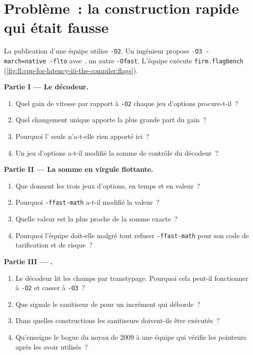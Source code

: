 \section{Problème~: la construction rapide qui était fausse}

\begin{problem}\label{pb:ll:cpp-for-latency-iii-the-compiler:1}
La publication d'une équipe utilise \texttt{-O2}. Un ingénieur propose
\texttt{-O3 -march=native -flto} avec , un autre \texttt{-Ofast}. L'équipe exécute \texttt{firm.flagbench}
(\cref{fig:ll:cpp-for-latency-iii-the-compiler:flags}).

\medskip\noindent\textbf{Partie I --- Le décodeur.}
\begin{enumerate}
\item Quel gain de vitesse par rapport à \texttt{-O2} chaque jeu d'options procure-t-il~?
\item Quel changement unique apporte la plus grande part du gain~?
\item Pourquoi l' seule n'a-t-elle rien apporté ici~?
\item Un jeu d'options a-t-il modifié la somme de contrôle du décodeur~?
\end{enumerate}

\medskip\noindent\textbf{Partie II --- La somme en virgule flottante.}
\begin{enumerate}[resume]
\item Que donnent les trois jeux d'options, en temps et en valeur~?
\item Pourquoi \texttt{-ffast-math} a-t-il modifié la valeur~?
\item Quelle valeur est la plus proche de la somme exacte~?
\item Pourquoi l'équipe doit-elle malgré tout refuser \texttt{-ffast-math} pour son code de tarification et de risque~?
\end{enumerate}

\medskip\noindent\textbf{Partie III --- .}
\begin{enumerate}[resume]
\item Le décodeur lit les champs par transtypage. Pourquoi cela peut-il fonctionner à \texttt{-O2} et casser à \texttt{-O3}~?
\item Que signale le sanitiseur de  pour un incrément qui déborde~?
\item Dans quelles constructions les sanitiseurs doivent-ils être exécutés~?
\item Qu'enseigne le bogue du noyau de 2009 à une équipe qui vérifie les pointeurs après les avoir utilisés~?
\end{enumerate}


\end{problem}

